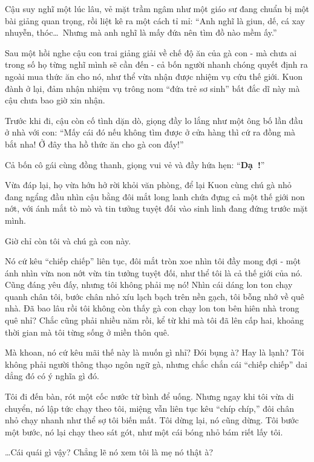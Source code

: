 \documentclass[../main.tex]{subfiles}
\begin{document}
Cậu suy nghĩ một lúc lâu, vẻ mặt trầm ngâm như một giáo sư đang chuẩn bị một bài giảng quan trọng, rồi liệt kê ra một cách tỉ mỉ: ``Anh nghĩ là giun, dế, cá xay nhuyễn, thóc\dots\ Nhưng mà anh nghĩ là mấy đứa nên tìm đồ nào mềm ấy.''

Sau một hồi nghe cậu con trai giảng giải về chế độ ăn của gà con - mà chưa ai trong số họ từng nghĩ mình sẽ cần đến - cả bốn người nhanh chóng quyết định ra ngoài mua thức ăn cho nó, như thể vừa nhận được nhiệm vụ cứu thế giới. Kuon đành ở lại, đảm nhận nhiệm vụ trông nom ``đứa trẻ sơ sinh'' bất đắc dĩ này mà cậu chưa bao giờ xin nhận.

Trước khi đi, cậu còn cố tình dặn dò, giọng đầy lo lắng như một ông bố lần đầu ở nhà với con: ``Mấy cái đó nếu không tìm được ở cửa hàng thì cứ ra đồng mà bắt nha! Ở đây tha hồ thức ăn cho gà con đấy!''

Cả bốn cô gái cùng đồng thanh, giọng vui vẻ và đầy hứa hẹn: ``\textbf{Dạ~{}!}''

Vừa đáp lại, họ vừa hớn hở rời khỏi văn phòng, để lại Kuon cùng chú gà nhỏ đang ngẩng đầu nhìn cậu bằng đôi mắt long lanh chứa đựng cả một thế giới non nớt, với ánh mắt tò mò và tin tưởng tuyệt đối vào sinh linh đang đứng trước mặt mình.


Giờ chỉ còn tôi và chú gà con này.

Nó cứ kêu ``chiếp chiếp'' liên tục, đôi mắt tròn xoe nhìn tôi đầy mong đợi - một ánh nhìn vừa non nớt vừa tin tưởng tuyệt đối, như thể tôi là cả thế giới của nó. Cũng đáng yêu đấy, nhưng tôi không phải mẹ nó! Nhìn cái dáng lon ton chạy quanh chân tôi, bước chân nhỏ xíu lạch bạch trên nền gạch, tôi bỗng nhớ về quê nhà. Đã bao lâu rồi tôi không còn thấy gà con chạy lon ton bên hiên nhà trong quê nhỉ? Chắc cũng phải nhiều năm rồi, kể từ khi mà tôi đã lên cấp hai, khoảng thời gian mà tôi từng sống ở miền thôn quê.

Mà khoan, nó cứ kêu mãi thế này là muốn gì nhỉ? Đói bụng à? Hay là lạnh? Tôi không phải người thông thạo ngôn ngữ gà, nhưng chắc chắn cái ``chiếp chiếp'' dai dẳng đó có ý nghĩa gì đó.

Tôi đi đến bàn, rót một cốc nước từ bình để uống. Nhưng ngay khi tôi vừa di chuyển, nó lập tức chạy theo tôi, miệng vẫn liên tục kêu ``chíp chíp,'' đôi chân nhỏ chạy nhanh như thể sợ tôi biến mất. Tôi dừng lại, nó cũng dừng. Tôi bước một bước, nó lại chạy theo sát gót, như một cái bóng nhỏ bám riết lấy tôi.

\dots Cái quái gì vậy? Chẳng lẽ nó xem tôi là mẹ nó thật à?
\end{document}
